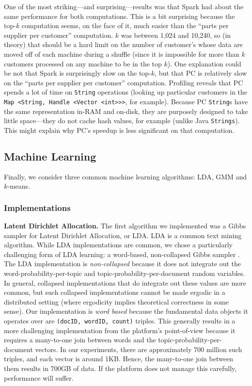 One of the most striking---and surprising---results was that Spark had about the same performance for both computations.  This is
a bit surprising because the top-$k$ computation seems, on the face of it, much easier 
than the ``parts per supplier per customer'' computation.  $k$ was between 1,024 and 10,240, so (in theory) that should be
a hard limit on the number of customer's whose data are moved off of each machine during a shuffle 
(since it is impossible for more than $k$
customers processed on any machine to be in the top $k$).  One explanation could be not that Spark is surprisingly slow on the
top-$k$, but that PC is relatively slow on the ``parts per supplier per customer'' computation.  Profiling reveals that PC spends
a lot of time on \texttt{String} operations (looking up particular customers in the
\texttt{Map <String, Handle <Vector <int}\texttt{>}\texttt{>}\texttt{>}, for example).  
Because PC \texttt{String}s have the same representation in-RAM and on-disk, they are purposely designed to take little
space---they do not cache hash values, for example (unlike Java \texttt{Strings}).  This might explain why PC's speedup is
less significant on that computation.

\subsection {Machine Learning}

Finally, we consider three common machine learning algorithms: LDA,
GMM and $k$-means. 

\subsubsection {Implementations}

\noindent
\textbf{Latent Dirichlet Allocation.}
The first algorithm we implemented was a Gibbs sampler for
Latent Dirichlet Allocation, or LDA.  LDA is a common text mining algorithm.
While LDA implementations are common, we
chose a particularly challenging form of LDA learning:
a 
word-based,
non-collapsed Gibbs sampler \cite{jermaineExperimental}.  The LDA implementation
is \emph{non-collapsed} because it does not integrate out the word-probability-per-topic
and topic-probability-per-document random variables. In general, collapsed implementations
that do integrate out these values are more common, but such collapsed implementations
cannot be made ergodic in a distributed setting
(where ergodicity implies theoretical correctness in some sense).
Our implementation is
\emph{word based} because the fundamental data objects it operates over are \texttt{(docID, wordID, count)} 
triples.  This generally results in a more challenging
implementation from the platform's point-of-view because it requires a many-to-one join between words
and the topic-probability-per-document vectors.  In our experiments, there are approximately
700 million such triples, and each vector is around 1KB.  Hence, the many-to-one join between them results in
700GB of data.  If the platform does not manage this carefully, performance will suffer.

